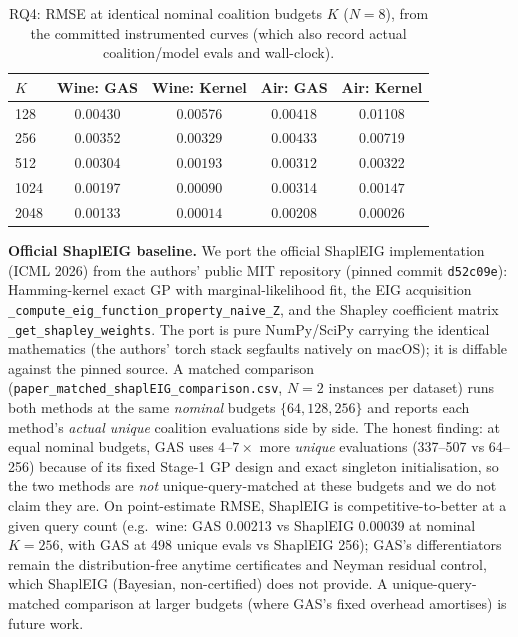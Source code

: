 \documentclass[preprint,12pt]{elsarticle}
\begin{document}
\begin{table}[htbp]\centering\small
\caption{RQ4: RMSE at identical nominal coalition budgets $K$ ($N{=}8$), from the committed instrumented curves (which also record actual coalition/model evals and wall-clock).}
\label{tab:rq5}
\begin{tabular}{lcc|cc}
\toprule
$K$ & Wine: GAS & Wine: Kernel & Air: GAS & Air: Kernel \\
\midrule
128  & $\mathbf{0.00430}$ & 0.00576 & $\mathbf{0.00418}$ & 0.01108 \\
256  & 0.00352 & $\mathbf{0.00329}$ & $\mathbf{0.00433}$ & 0.00719 \\
512  & 0.00304 & $\mathbf{0.00193}$ & $\mathbf{0.00312}$ & 0.00322 \\
1024 & 0.00197 & $\mathbf{0.00090}$ & 0.00314 & $\mathbf{0.00147}$ \\
2048 & 0.00133 & $\mathbf{0.00014}$ & 0.00208 & $\mathbf{0.00026}$ \\
\bottomrule
\end{tabular}
\end{table}

\textbf{Official ShaplEIG baseline.} We port the official ShaplEIG implementation (ICML 2026) from the authors' public MIT repository (pinned commit \texttt{d52c09e}): Hamming-kernel exact GP with marginal-likelihood fit, the EIG acquisition \texttt{\_compute\_eig\_function\_property\_naive\_Z}, and the Shapley coefficient matrix \texttt{\_get\_shapley\_weights}. The port is pure NumPy/SciPy carrying the identical mathematics (the authors' torch stack segfaults natively on macOS); it is diffable against the pinned source. A matched comparison (\texttt{paper\_matched\_shaplEIG\_comparison.csv}, $N{=}2$ instances per dataset) runs both methods at the same \emph{nominal} budgets $\{64,128,256\}$ and reports each method's \emph{actual unique} coalition evaluations side by side. The honest finding: at equal nominal budgets, GAS uses $4$--$7\times$ more \emph{unique} evaluations (337--507 vs 64--256) because of its fixed Stage-1 GP design and exact singleton initialisation, so the two methods are \emph{not} unique-query-matched at these budgets and we do not claim they are. On point-estimate RMSE, ShaplEIG is competitive-to-better at a given query count (e.g.\ wine: GAS 0.00213 vs ShaplEIG 0.00039 at nominal $K{=}256$, with GAS at 498 unique evals vs ShaplEIG 256); GAS's differentiators remain the distribution-free anytime certificates and Neyman residual control, which ShaplEIG (Bayesian, non-certified) does not provide. A unique-query-matched comparison at larger budgets (where GAS's fixed overhead amortises) is future work.
\end{document}
